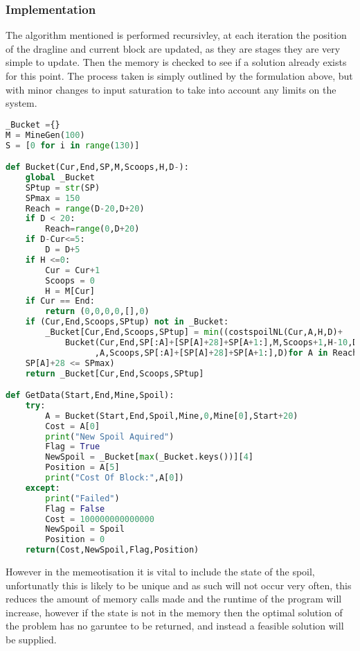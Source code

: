 \subsubsection{Implementation}
The algorithm mentioned is performed recursivley, at each iteration the position of the dragline and current block are updated, as they are stages they are very simple to update. Then the memory is checked to see if a solution already exists for this point. The process taken is simply outlined by the formulation above, but with minor changes to input saturation to take into account any limits on the system.
\begin{lstlisting}[language=python]
_Bucket ={}
M = MineGen(100)
S = [0 for i in range(130)]

def Bucket(Cur,End,SP,M,Scoops,H,D-):
    global _Bucket
    SPtup = str(SP)
    SPmax = 150
    Reach = range(D-20,D+20) 
    if D < 20:
        Reach=range(0,D+20) 
    if D-Cur<=5:
        D = D+5
    if H <=0:
        Cur = Cur+1
        Scoops = 0
        H = M[Cur]
    if Cur == End:
        return (0,0,0,0,[],0)
    if (Cur,End,Scoops,SPtup) not in _Bucket:
        _Bucket[Cur,End,Scoops,SPtup] = min((costspoilNL(Cur,A,H,D)+
            Bucket(Cur,End,SP[:A]+[SP[A]+28]+SP[A+1:],M,Scoops+1,H-10,D)[0],Cur\
                  ,A,Scoops,SP[:A]+[SP[A]+28]+SP[A+1:],D)for A in Reach if\
    SP[A]+28 <= SPmax)
    return _Bucket[Cur,End,Scoops,SPtup]

def GetData(Start,End,Mine,Spoil):
    try:
        A = Bucket(Start,End,Spoil,Mine,0,Mine[0],Start+20)
        Cost = A[0]        
        print("New Spoil Aquired")
        Flag = True
        NewSpoil = _Bucket[max(_Bucket.keys())][4]
        Position = A[5]
        print("Cost Of Block:",A[0])
    except:
        print("Failed")
        Flag = False
        Cost = 100000000000000
        NewSpoil = Spoil
        Position = 0
    return(Cost,NewSpoil,Flag,Position)

\end{lstlisting}
However in the memeotisation it is vital to include the state of the spoil, unfortunatly this is likely to be unique and as such will not occur very often, this reduces the amount of memory calls made and the runtime of the program will increase, however if the state is not in the memory then the optimal solution of the problem has no garuntee to be returned, and instead a feasible solution will be supplied. 



